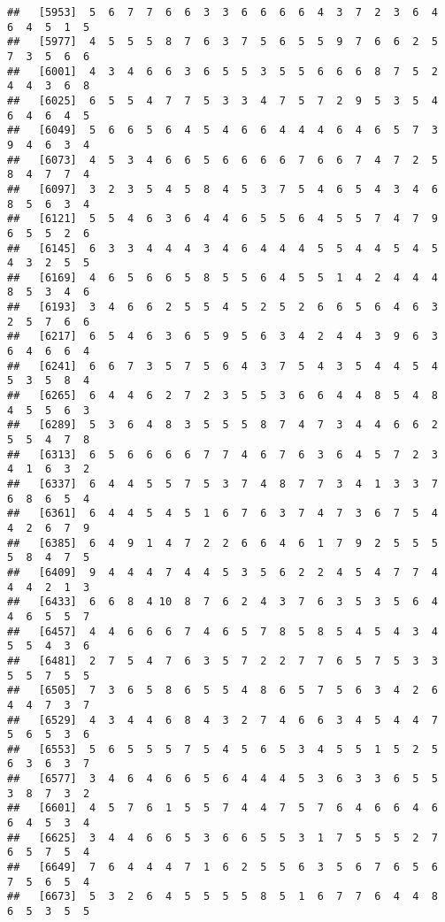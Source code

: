 \documentclass[
]{book}
\begin{document}
\begin{verbatim}
##   [5953]  5  6  7  7  6  6  3  3  6  6  6  6  4  3  7  2  3  6  4  6  4  5  1  5
##   [5977]  4  5  5  5  8  7  6  3  7  5  6  5  5  9  7  6  6  2  5  7  3  5  6  6
##   [6001]  4  3  4  6  6  3  6  5  5  3  5  5  6  6  6  8  7  5  2  4  4  3  6  8
##   [6025]  6  5  5  4  7  7  5  3  3  4  7  5  7  2  9  5  3  5  4  6  4  6  4  5
##   [6049]  5  6  6  5  6  4  5  4  6  6  4  4  4  6  4  6  5  7  3  9  4  6  3  4
##   [6073]  4  5  3  4  6  6  5  6  6  6  6  7  6  6  7  4  7  2  5  8  4  7  7  4
##   [6097]  3  2  3  5  4  5  8  4  5  3  7  5  4  6  5  4  3  4  6  8  5  6  3  4
##   [6121]  5  5  4  6  3  6  4  4  6  5  5  6  4  5  5  7  4  7  9  6  5  5  2  6
##   [6145]  6  3  3  4  4  4  3  4  6  4  4  4  5  5  4  4  5  4  5  4  3  2  5  5
##   [6169]  4  6  5  6  6  5  8  5  5  6  4  5  5  1  4  2  4  4  4  8  5  3  4  6
##   [6193]  3  4  6  6  2  5  5  4  5  2  5  2  6  6  5  6  4  6  3  2  5  7  6  6
##   [6217]  6  5  4  6  3  6  5  9  5  6  3  4  2  4  4  3  9  6  3  6  4  6  6  4
##   [6241]  6  6  7  3  5  7  5  6  4  3  7  5  4  3  5  4  4  5  4  5  3  5  8  4
##   [6265]  6  4  4  6  2  7  2  3  5  5  3  6  6  4  4  8  5  4  8  4  5  5  6  3
##   [6289]  5  3  6  4  8  3  5  5  5  8  7  4  7  3  4  4  6  6  2  5  5  4  7  8
##   [6313]  6  5  6  6  6  6  7  7  4  6  7  6  3  6  4  5  7  2  3  4  1  6  3  2
##   [6337]  6  4  4  5  5  7  5  3  7  4  8  7  7  3  4  1  3  3  7  6  8  6  5  4
##   [6361]  6  4  4  5  4  5  1  6  7  6  3  7  4  7  3  6  7  5  4  4  2  6  7  9
##   [6385]  6  4  9  1  4  7  2  2  6  6  4  6  1  7  9  2  5  5  5  5  8  4  7  5
##   [6409]  9  4  4  4  7  4  4  5  3  5  6  2  2  4  5  4  7  7  4  4  4  2  1  3
##   [6433]  6  6  8  4 10  8  7  6  2  4  3  7  6  3  5  3  5  6  4  4  6  5  5  7
##   [6457]  4  4  6  6  6  7  4  6  5  7  8  5  8  5  4  5  4  3  4  5  5  4  3  6
##   [6481]  2  7  5  4  7  6  3  5  7  2  2  7  7  6  5  7  5  3  3  5  5  7  5  5
##   [6505]  7  3  6  5  8  6  5  5  4  8  6  5  7  5  6  3  4  2  6  4  4  7  3  7
##   [6529]  4  3  4  4  6  8  4  3  2  7  4  6  6  3  4  5  4  4  7  5  6  5  3  6
##   [6553]  5  6  5  5  5  7  5  4  5  6  5  3  4  5  5  1  5  2  5  6  3  6  3  7
##   [6577]  3  4  6  4  6  6  5  6  4  4  4  5  3  6  3  3  6  5  5  3  8  7  3  2
##   [6601]  4  5  7  6  1  5  5  7  4  4  7  5  7  6  4  6  6  4  6  6  4  5  3  4
##   [6625]  3  4  4  6  6  5  3  6  6  5  5  3  1  7  5  5  5  2  7  6  5  7  5  4
##   [6649]  7  6  4  4  4  7  1  6  2  5  5  6  3  5  6  7  6  5  6  7  5  6  5  4
##   [6673]  5  3  2  6  4  5  5  5  5  8  5  1  6  7  7  6  4  4  8  6  5  3  5  5

\end{verbatim}
\end{document}

